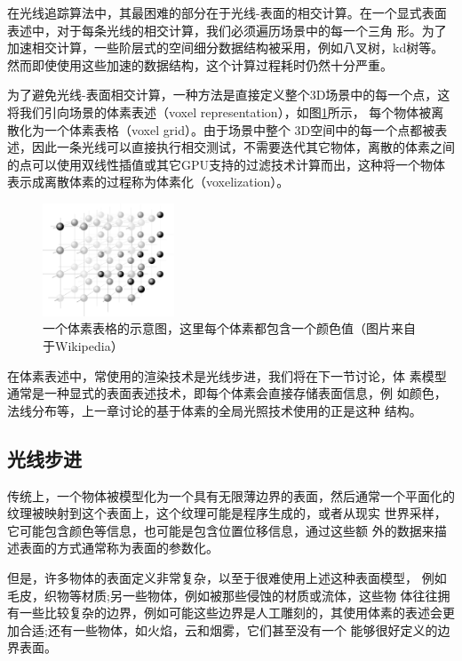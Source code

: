 在光线追踪算法中，其最困难的部分在于光线-表面的相交计算。在一个显式表面表述中，对于每条光线的相交计算，我们必须遍历场景中的每一个三角 形。为了加速相交计算，一些阶层式的空间细分数据结构被采用，例如八叉树，kd树等。然而即使使用这些加速的数据结构，这个计算过程耗时仍然十分严重。

为了避免光线-表面相交计算，一种方法是直接定义整个3D场景中的每一个点，这将我们引向场景的体素表述（voxel representation），如图\ref{f:df-Voxelgitter}所示， 每个物体被离散化为一个体素表格（voxel grid）。由于场景中整个 3D空间中的每一个点都被表述，因此一条光线可以直接执行相交测试，不需要迭代其它物体，离散的体素之间的点可以使用双线性插值或其它GPU支持的过滤技术计算而出，这种将一个物体表示成离散体素的过程称为体素化（voxelization）。

\begin{figure}
	\sidecaption
	\includegraphics[width=0.35\textwidth]{figures/df/Voxelgitter}
	\caption{一个体素表格的示意图，这里每个体素都包含一个颜色值（图片来自于Wikipedia）}
	\label{f:df-Voxelgitter}
\end{figure}

在体素表述中，常使用的渲染技术是光线步进，我们将在下一节讨论，体 素模型通常是一种显式的表面表述技术，即每个体素会直接存储表面信息，例 如颜色，法线分布等，上一章讨论的基于体素的全局光照技术使用的正是这种 结构。




\subsection{光线步进}
传统上，一个物体被模型化为一个具有无限薄边界的表面，然后通常一个平面化的纹理被映射到这个表面上，这个纹理可能是程序生成的，或者从现实 世界采样，它可能包含颜色等信息，也可能是包含位置位移信息，通过这些额 外的数据来描述表面的方式通常称为表面的参数化。

但是，许多物体的表面定义非常复杂，以至于很难使用上述这种表面模型， 例如毛皮，织物等材质;另一些物体，例如被那些侵蚀的材质或流体，这些物 体往往拥有一些比较复杂的边界，例如可能这些边界是人工雕刻的，其使用体素的表述会更加合适;还有一些物体，如火焰，云和烟雾，它们甚至没有一个 能够很好定义的边界表面。


